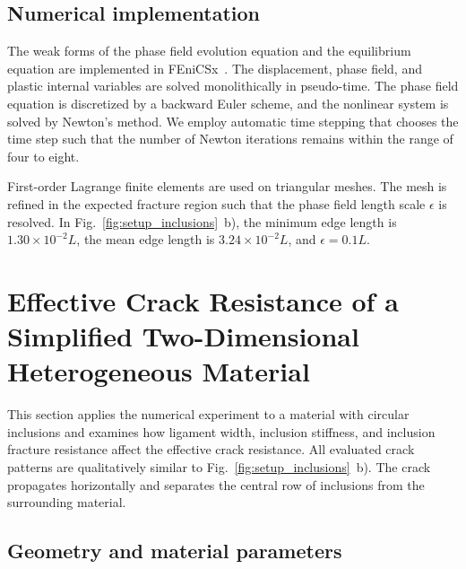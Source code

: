 \documentclass[pamm,a4paper,fleqn]{w-art}
\begin{document}
\subsection{Numerical
  implementation}\label{sec:numerical_implementation}

The weak forms of the phase field evolution equation and the
equilibrium equation are implemented in FEniCSx~\cite{_fenicsx_}. The
displacement, phase field, and plastic internal variables are solved
monolithically in pseudo-time. The phase field equation is
discretized by a backward Euler scheme, and the nonlinear system is
solved by Newton's method. We employ automatic time stepping that
chooses the time step such that the number of Newton iterations
remains within
the range of four to eight.

First-order Lagrange finite elements are used on triangular meshes.
The mesh is refined in the expected fracture region such that the
phase field length scale $\epsilon$ is resolved. In
Fig.~\ref{fig:setup_inclusions}~b), the minimum edge length is
\(1.30\times 10^{-2}L\), the mean edge length is \(3.24\times
10^{-2}L\), and \(\epsilon=0.1L\).

\section{Effective Crack Resistance of a Simplified Two-Dimensional
  Heterogeneous Material}\label{sec:2Dresults}

This section applies the numerical experiment to a material with
circular inclusions and examines how ligament width, inclusion
stiffness, and inclusion fracture resistance affect the effective
crack resistance.
All evaluated crack patterns are qualitatively similar to
Fig.~\ref{fig:setup_inclusions}~b). The crack propagates
horizontally and separates the central row of inclusions from the
surrounding material.

\subsection{Geometry and material parameters}\label{sec:geometry}
\end{document}

